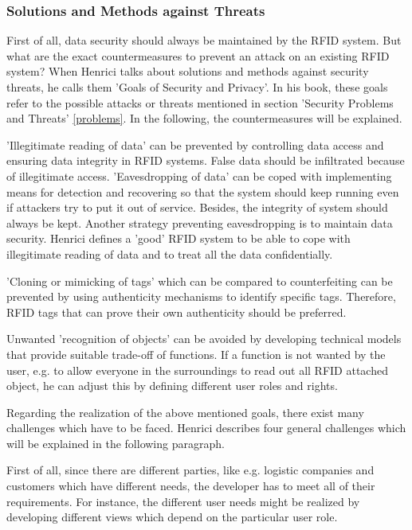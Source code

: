 \subsubsection{Solutions and Methods against Threats} \label{solution}

First of all, data security should always be maintained by the RFID system. But what are the exact countermeasures to prevent an attack on an existing RFID system? When Henrici \cite[p.64 ff.]{henrici} talks about solutions and methods against security threats, he calls them 'Goals of Security and Privacy'. In his book, these goals refer to the possible attacks or threats mentioned in section 'Security Problems and Threats' \ref{problems}. In the following, the countermeasures will be explained. 

'Illegitimate reading of data' can be prevented by controlling data access and ensuring data integrity in RFID systems. False data should be infiltrated because of illegitimate access.
'Eavesdropping of data' can be coped with implementing means for detection and recovering so that the system should keep running even if attackers try to put it out of service. Besides, the integrity of system should always be kept. Another strategy preventing eavesdropping is to maintain data security. Henrici defines a 'good' RFID system to be able to cope with illegitimate reading of data and to treat all the data confidentially.

'Cloning or mimicking of tags' which can be compared to counterfeiting can be prevented by using authenticity mechanisms to identify specific tags. Therefore, RFID tags that can prove their own authenticity should be preferred.

Unwanted 'recognition of objects' can be avoided by developing technical models that provide suitable trade-off of functions. If a function is not wanted by the user, e.g. to allow everyone in the surroundings to read out all RFID attached object, he can adjust this by defining different user roles and rights.

Regarding the realization of the above mentioned goals, there exist many challenges which have to be faced. Henrici \cite[p.66 ff.]{henrici} describes four general challenges which will be explained in the following paragraph. 

First of all, since there are different parties, like e.g. logistic companies and customers which have different needs, the developer has to meet all of their requirements. For instance, the different user needs might be realized by developing different views which depend on the particular user role.

